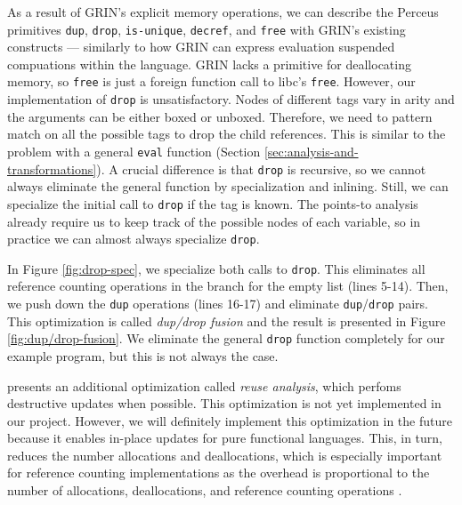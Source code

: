 \documentclass[9pt, twocolumn]{article}
\begin{document}
As a result of GRIN's explicit memory operations, we can describe the Perceus primitives \lstinline{dup}, \lstinline{drop}, \lstinline{is-unique}, \lstinline{decref}, and \lstinline{free} with GRIN's existing constructs --- similarly to how GRIN can express evaluation suspended compuations within the language.
GRIN lacks a primitive for deallocating memory, so \lstinline{free} is just a foreign function call to libc's \lstinline{free}. 
However, our implementation of \lstinline{drop} is unsatisfactory. 
Nodes of different tags vary in arity and the arguments can be either boxed or unboxed.
Therefore, we need to pattern match on all the possible tags to drop the child references. 
This is similar to the problem with a general \lstinline{eval} function (Section \ref{sec:analysis-and-transformations}). 
A crucial difference is that \lstinline{drop} is recursive, so we cannot always eliminate the general function by specialization and inlining.
Still, we can specialize the initial call to \lstinline{drop} if the tag is known. 
The points-to analysis already require us to keep track of the possible nodes of each variable, so in practice we can almost always specialize \lstinline{drop}.



In Figure \ref{fig:drop-spec}, we specialize both calls to \lstinline{drop}.
This eliminates all reference counting operations in the branch for the empty list (lines 5-14).
Then, we push down the \lstinline{dup} operations (lines 16-17) and eliminate \lstinline{dup}/\lstinline{drop} pairs.
This optimization is called \emph{dup/drop fusion} and the result is presented in Figure \ref{fig:dup/drop-fusion}.
We eliminate the general \lstinline{drop} function completely for our example program, but this is not always the case. 

\citeauthor{reinking2021} presents an additional optimization called \emph{reuse analysis}, which perfoms destructive updates when possible.
This optimization is not yet implemented in our project. 
However, we will definitely implement this optimization in the future because it enables in-place updates for pure functional languages.
This, in turn, reduces the number allocations and deallocations, which is especially important for reference counting implementations as the overhead is proportional to the number of allocations, deallocations, and reference counting operations \citep{wilson1992}.
\end{document}
